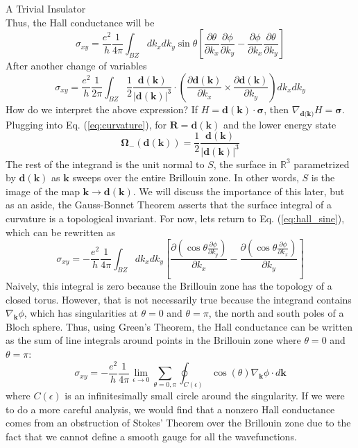 \documentclass[a4paper,12pt]{article}
\renewcommand{\vec}[1]{\boldsymbol{\mathbf{#1}}}
\begin{document}
\begin{section}{A Trivial Insulator}
\begin{equation}
\end{equation}
Thus, the Hall conductance will be
\begin{equation}
\sigma_{xy}=\frac{e^2}{h} \frac{1}{4 \pi} \int_{BZ} dk_x dk_y \sin{\theta} \left[ \frac{\partial \theta}{\partial k_x} \frac{\partial \phi}{\partial k_y} - \frac{\partial \phi}{\partial k_x} \frac{\partial \theta}{\partial k_y} \right]
\label{eq:hall_sine}
\end{equation}
After another change of variables \cite{dirac_materials}
\begin{equation}
\sigma_{xy}=\frac{e^2}{h} \frac{1}{2 \pi} \int_{BZ} \frac{1}{2} \frac{\vec{d}(\vec{k})}{|\vec{d}(\vec{k})|^3}\cdot \left( \frac{\partial \vec{d}(\vec{k})}{\partial k_x} \times \frac{\partial \vec{d}(\vec{k})}{\partial k_y}\right) dk_x dk_y
\label{eq:degree}
\end{equation}
How do we interpret the above expression?  If $H=\vec{d}(\vec{k}) \cdot \vec{\sigma}$, then $\nabla_{\vec{d}({\vec{k})}}H=\vec{\sigma}$.  Plugging into Eq. (\ref{eq:curvature}), for $\vec{R}=\vec{d}(\vec{k})$ and the lower energy state
\begin{equation}
\vec{\Omega}_-(\vec{d}(\vec{k}))=\frac{1}{2} \frac{\vec{d}(\vec{k})}{|\vec{d}(\vec{k})|^3}
\end{equation}
The rest of the integrand is the unit normal to $S$, the surface in $\mathbb{R}^3$ parametrized by $\vec{d}(\vec{k})$ as $\vec{k}$ sweeps over the entire Brillouin zone.  In other words, $S$ is the image of the map $\vec{k} \rightarrow \vec{d}(\vec{k})$.  We will discuss the importance of this later, but as an aside, the Gauss-Bonnet Theorem asserts that the surface integral of a curvature is a topological invariant.  For now, lets return to Eq. (\ref{eq:hall_sine}), which can be rewritten as
\begin{equation}
\sigma_{xy}=-\frac{e^2}{h} \frac{1}{4 \pi} \int_{BZ} dk_x dk_y \left[ \frac{\partial \left( \cos{\theta} \frac{\partial \phi}{\partial k_y} \right)}{\partial k_x} - \frac{\partial \left( \cos{\theta} \frac{\partial \phi}{\partial k_x} \right)}{\partial k_y} \right]
\end{equation}
Naively, this integral is zero because the Brillouin zone has the topology of a closed torus.  However, that is not necessarily true because the integrand contains $\nabla_{\vec{k}} \phi$, which has singularities at $\theta=0$ and $\theta=\pi$, the north and south poles of a Bloch sphere.  Thus, using Green's Theorem, the Hall conductance can be written as the sum of line integrals around points in the Brillouin zone where $\theta=0$ and $\theta=\pi$:
\begin{equation}
\sigma_{xy}=-\frac{e^2}{h} \frac{1}{4 \pi} \lim_{\epsilon \rightarrow 0} \sum_{\theta=0,\pi} \oint_{C(\epsilon)} \cos(\theta) \nabla_{\vec{k}} \phi \cdot d\vec{k}
\end{equation}
where $C(\epsilon)$ is an infinitesimally small circle around the singularity.  If we were to do a more careful analysis, we would find that a nonzero Hall conductance comes from an obstruction of Stokes' Theorem over the Brillouin zone due to the fact that we cannot define a smooth gauge for all the wavefunctions.


\end{section}
\end{document}
